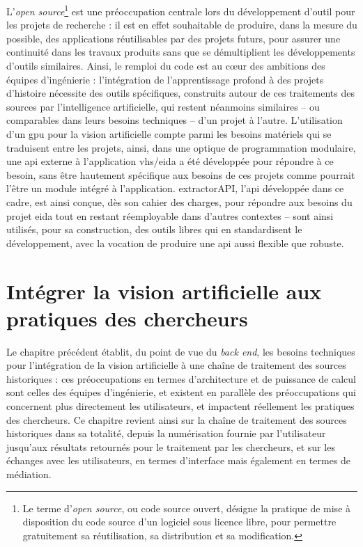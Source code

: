 \documentclass[a4paper,12pt,twoside]{book}
\newcommand{\api}{\gls{api}\xspace}
\newcommand{\eida}{\gls{eida}\xspace}
\newcommand{\exapi}{extractorAPI\xspace}
\newcommand{\gpu}{\gls{gpu}\xspace}
\newcommand{\ia}{intelligence artificielle\xspace}
\newcommand{\vhs}{\gls{vhs}\xspace}
\newcommand{\clearemptydoublepage}{\newpage{\pagestyle{empty}\cleardoublepage}}
\begin{document}
        L'\textit{open source}\footnote{Le terme d'\textit{open source}, ou code source ouvert, désigne la pratique de mise à disposition du code source d'un logiciel sous licence libre, pour permettre gratuitement sa réutilisation, sa distribution et sa modification.} est une préoccupation centrale lors du développement d'outil pour les projets de recherche : il est en effet souhaitable de produire, dans la mesure du possible, des applications réutilisables par des projets futurs, pour assurer une continuité dans les travaux produits sans que se démultiplient les développements d'outils similaires. Ainsi, le remploi du code est au cœur des ambitions des équipes d'ingénierie : l'intégration de l'apprentissage profond à des projets d'histoire nécessite des outils spécifiques, construits autour de ces traitements des sources par l'\ia, qui restent néanmoins similaires -- ou comparables dans leurs besoins techniques -- d'un projet à l'autre. L'utilisation d'un \gpu pour la vision artificielle compte parmi les besoins matériels qui se traduisent entre les projets, ainsi, dans une optique de programmation modulaire, une \api externe à l'application \vhs/\eida a été développée pour répondre à ce besoin, sans être hautement spécifique aux besoins de ces projets comme pourrait l'être un module intégré à l'application. \exapi, l'\api développée dans ce cadre, est ainsi conçue, dès son cahier des charges, pour répondre aux besoins du projet \eida tout en restant réemployable dans d'autres contextes -- sont ainsi utilisés, pour sa construction, des outils libres qui en standardisent le développement, avec la vocation de produire une \api aussi flexible que robuste.
        \clearemptydoublepage
            
      	\chapter[\textit{Computer vision} et pratiques des chercheurs]{Intégrer la vision artificielle aux pratiques des chercheurs}
      	Le chapitre précédent établit, du point de vue du \textit{back end}, les besoins techniques pour l'intégration de la vision artificielle à une chaîne de traitement des sources historiques : ces préoccupations en termes d'architecture et de puissance de calcul sont celles des équipes d'ingénierie, et existent en parallèle des préoccupations qui concernent plus directement les utilisateurs, et impactent réellement les pratiques des chercheurs. Ce chapitre revient ainsi sur la chaîne de traitement des sources historiques dans sa totalité, depuis la numérisation fournie par l'utilisateur jusqu'aux résultats retournés pour le traitement par les chercheurs, et sur les échanges avec les utilisateurs, en termes d'interface mais également en termes de médiation.
               
\end{document}
